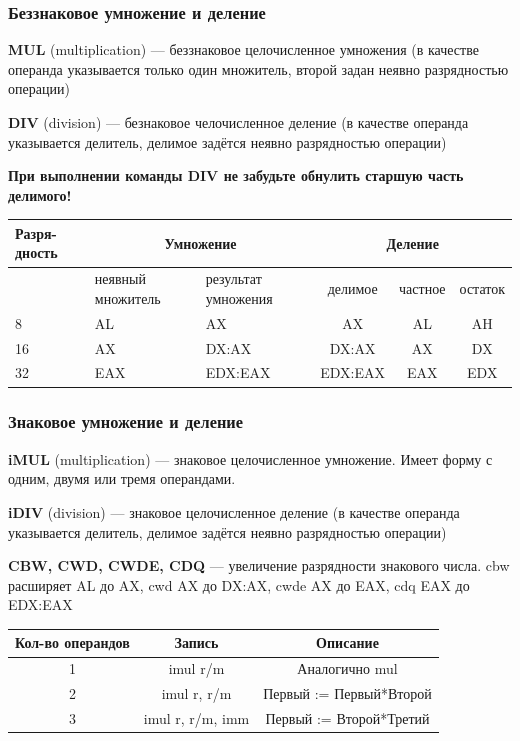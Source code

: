 \documentclass[utf8, russian]{beamer}
\begin{document}
    \begin{frame}[fragile]
        \frametitle{Беззнаковое умножение и деление}
        {\bf MUL } (multiplication) --- беззнаковое целочисленное умножения (в качестве операнда указывается только один множитель, второй задан неявно разрядностью операции)

        {\bf DIV } (division) --- безнаковое челочисленное деление (в качестве операнда указывается делитель, делимое задётся неявно разрядностью операции)

        {\bf При выполнении команды DIV не забудьте обнулить старшую часть делимого!}


        \begin{table}\small
            \begin{tabular}{|p{1cm}|p{2cm}|p{2cm}||c|c|c|}
                \hline Разря-дность & \multicolumn{2}{|c||}{Умножение} & \multicolumn{3}{|c|}{Деление} \\
                \hline  & неявный \newline множитель & результат \newline умножения & делимое & частное & остаток \\
                \hline 8 & AL & AX &  AX & AL & AH \\
                \hline 16 & AX & DX:AX & DX:AX & AX & DX \\
                \hline 32 & EAX & EDX:EAX & EDX:EAX & EAX & EDX \\
                \hline
            \end{tabular}
        \end{table}
\end{frame}
    \begin{frame}[fragile]
        \frametitle{Знаковое умножение и деление}
        {\bf iMUL } (multiplication) --- знаковое целочисленное умножение. Имеет форму с одним, двумя или тремя операндами.

        {\bf iDIV } (division) --- знаковое целочисленное деление (в качестве операнда указывается делитель, делимое задётся неявно разрядностью операции)

        {\bf CBW, CWD, CWDE, CDQ} --- увеличение разрядности знакового числа. cbw расширяет AL до AX, cwd AX до DX:AX, cwde AX до EAX, cdq EAX до EDX:EAX
        \begin{table}\small
            \begin{tabular}{|c|c|c|}
                \hline Кол-во операндов & Запись & Описание \\
                \hline 1 & imul r/m & Аналогично mul \\
                \hline 2 & imul r, r/m & Первый := Первый*Второй \\
                \hline 3 & imul r, r/m, imm & Первый := Второй*Третий \\
                \hline
            \end{tabular}
        \end{table}
\end{frame}
\end{document}
